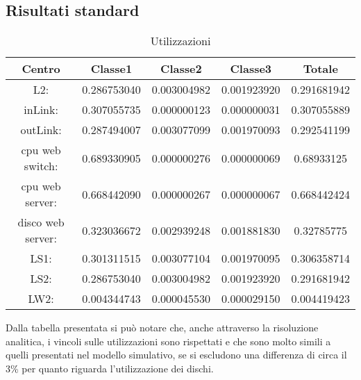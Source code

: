 \subsection{Risultati standard}
\begin{table}[H]
\begin{center}
\begin{tabular}{||c|c|c|c|c||}
\hline
Centro &Classe1 &Classe2 &Classe3 &Totale\\
\hline
\hline
L2: &0.286753040 &0.003004982 &0.001923920 &0.291681942\\
\hline
inLink: &0.307055735 &0.000000123 &0.000000031 &0.307055889\\
\hline
outLink: &0.287494007 &0.003077099 &0.001970093 &0.292541199\\
\hline
cpu web switch: &0.689330905 &0.000000276 &0.000000069 &0.68933125\\
\hline
cpu web server: &0.668442090 &0.000000267 &0.000000067 &0.668442424\\
\hline
disco web server: &0.323036672 &0.002939248 &0.001881830 &0.32785775\\
\hline
LS1: &0.301311515 &0.003077104 &0.001970095 &0.306358714\\
\hline
LS2: &0.286753040 &0.003004982 &0.001923920 &0.291681942\\
\hline
LW2: &0.004344743 &0.000045530 &0.000029150 &0.004419423\\
\hline
\end{tabular}
\end{center}
\caption{Utilizzazioni}
\label{utilizzazioni}
\end{table}
Dalla tabella presentata si può notare che, anche attraverso la risoluzione analitica, i vincoli sulle utilizzazioni sono rispettati e che sono molto simili a quelli presentati nel modello simulativo, se si escludono una differenza di circa il 3\% per quanto riguarda l'utilizzazione dei dischi.
